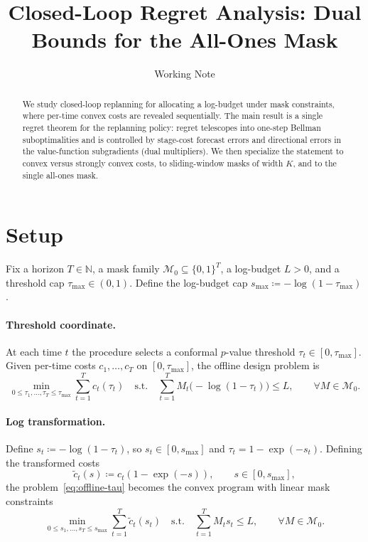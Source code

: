 \documentclass[11pt]{article}
\title{Closed-Loop Regret Analysis: Dual Bounds for the All-Ones Mask}
\author{Working Note}
\date{}
\newcommand{\N}{\mathbb{N}}
\newcommand{\1}{\mathbf{1}}
\newcommand{\eqdef}{\coloneqq}
\newcommand{\mcal}{\mathcal{M}}
\begin{document}
\maketitle

\begin{abstract}
  We study closed-loop replanning for allocating a log-budget under mask constraints, where per-time convex costs are revealed sequentially.
  The main result is a single regret theorem for the replanning policy: regret telescopes into one-step Bellman suboptimalities and is controlled by stage-cost forecast errors and directional errors in the value-function subgradients (dual multipliers).
  We then specialize the statement to convex versus strongly convex costs, to sliding-window masks of width $K$, and to the single all-ones mask.
\end{abstract}

\tableofcontents

\section{Setup}
\label{sec:setup}%

Fix a horizon $T \in \N$, a mask family $\mcal_{0} \subseteq \{0,1\}^{T}$, a log-budget $L > 0$, and a threshold cap $\tau_{\max} \in (0,1)$.
Define the log-budget cap $s_{\max} \eqdef -\log({1-\tau_{\max}})$.

\paragraph{Threshold coordinate.}
At each time $t$ the procedure selects a conformal $p$-value threshold $\tau_t \in [0,\tau_{\max}]$.
Given per-time costs $c_1,\dots,c_T$ on $[0,\tau_{\max}]$, the offline design problem is
\begin{equation}
  \label{eq:offline-tau}
  \min_{0 \leq \tau_1,\dots,\tau_T \leq \tau_{\max}} \sum_{t=1}^{T} c_t(\tau_t)
  \quad \text{s.t.} \quad
  \sum_{t=1}^{T} M_t \bigl(-\log({1-\tau_t})\bigr) \leq L, \qquad \forall M \in \mcal_{0}.
\end{equation}

\paragraph{Log transformation.}
Define $s_t \eqdef -\log({1-\tau_t})$, so $s_t \in [0,s_{\max}]$ and $\tau_t = 1-\exp({-s_t})$.
Defining the transformed costs
\begin{equation*}
  \tilde{c}_t(s) \eqdef c_t(1-\exp({-s})),
  \qquad
  s \in [0,s_{\max}],
\end{equation*}
the problem~\eqref{eq:offline-tau} becomes the convex program with linear mask constraints
\begin{equation}
  \label{eq:offline}
  \min_{0 \leq s_1,\dots,s_T \leq s_{\max}} \sum_{t=1}^{T} \tilde{c}_t(s_t)
  \quad \text{s.t.} \quad
  \sum_{t=1}^{T} M_t s_t \leq L, \qquad \forall M \in \mcal_{0}.
\end{equation}
\end{document}
